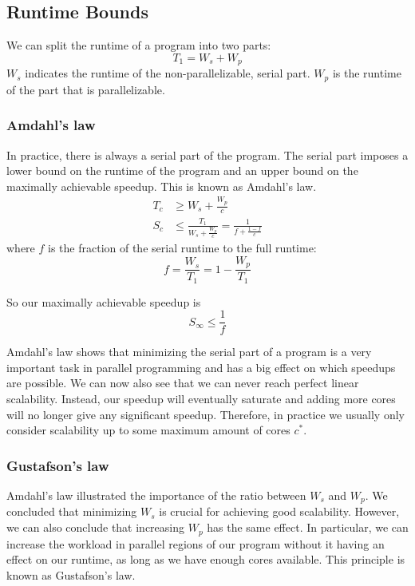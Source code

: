 \subsection{Runtime Bounds}

We can split the runtime of a program into two parts:
\begin{equation}
    T_1 = W_s + W_p
\end{equation}
$W_s$ indicates the runtime of the non-parallelizable, serial part.
$W_p$ is the runtime of the part that is parallelizable.

\subsubsection{Amdahl's law}

In practice, there is always a serial part of the program.
The serial part imposes a lower bound on the runtime of the program and an upper bound on the maximally achievable speedup.
This is known as Amdahl's law.
\begin{align*}
    T_c &\geq W_s + \frac{W_p}{c} \\
    S_c &\leq \frac{T_1}{W_s + \frac{W_p}{c}} = \frac{1}{f + \frac{1-f}{c}}
\end{align*}
where $f$ is the fraction of the serial runtime to the full runtime:
\begin{equation*}
    f = \frac{W_s}{T_1} = 1 - \frac{W_p}{T_1}
\end{equation*}

So our maximally achievable speedup is
\begin{equation}
    S_\infty \leq \frac{1}{f}
\end{equation}

Amdahl's law shows that minimizing the serial part of a program is a very important task in parallel programming and has a big effect on which speedups are possible.
We can now also see that we can never reach perfect linear scalability.
Instead, our speedup will eventually saturate and adding more cores will no longer give any significant speedup.
Therefore, in practice we usually only consider scalability up to some maximum amount of cores $c^*$.

\subsubsection{Gustafson's law}

Amdahl's law illustrated the importance of the ratio between $W_s$ and $W_p$.
We concluded that minimizing $W_s$ is crucial for achieving good scalability.
However, we can also conclude that increasing $W_p$ has the same effect.
In particular, we can increase the workload in parallel regions of our program without it having an effect on our runtime, as long as we have enough cores available.
This principle is known as Gustafson's law.
